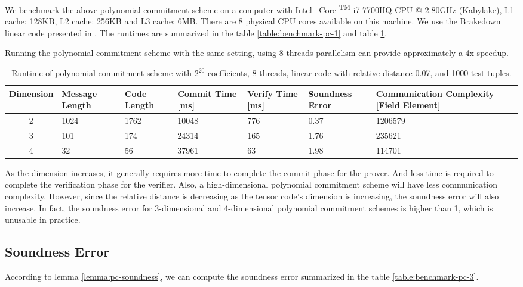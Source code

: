We benchmark the above polynomial commitment scheme on a computer with
Intel \textregistered \, Core  \textsuperscript{TM} i7-7700HQ CPU @ 2.80GHz (Kabylake), L1 cache: 128KB, L2 cache: 256KB and L3 cache: 6MB. There are 8 physical CPU cores available on this machine. We use the Brakedown linear code presented in \cite{brakedown}. The runtimes are summarized in the table \ref{table:benchmark-pc-1} and table \ref{table:benchmark-pc-2}.


Running the polynomial commitment scheme with the same setting, using 8-threads-parallelism can provide approximately a 4x speedup.

\begin{table}[h!]
\centering
\begin{tabular}{| c | m{4em}  | m{3em}  | m{3.5em} | m{2.5em} | m{5em} | m{7em} |} 
 \hline
 Dimension & Message Length & Code Length & Commit Time [ms] & Verify Time [ms] & Soundness Error & Communication Complexity [Field Element] \\ [0.5ex] 
 \hline\hline
 2 & 1024   & 1762 & 10048 & 776 & 0.37 & 1206579  \\
 \hline
 3 & 101    & 174 & 24314 & 165 & 1.76 & 235621 \\
 \hline
 4 & 32     & 56 & 37961 & 63 & 1.98 & 114701  \\ 
 \hline
\end{tabular}
\caption{Runtime of polynomial commitment scheme with $2^{20}$ coefficients, 8 threads, linear code with relative distance 0.07, and 1000 test tuples.}
\label{table:benchmark-pc-2}
\end{table}


As the dimension increases, it generally requires more time to complete the commit phase for the prover. And less time is required to complete the verification phase for the verifier. Also, a high-dimensional polynomial commitment scheme will have less communication complexity. However, since the relative distance is decreasing as the tensor code's dimension is increasing, the soundness error will also increase. In fact, the soundness error for 3-dimensional and 4-dimensional polynomial commitment schemes is higher than 1, which is unusable in practice.

\subsection{Soundness Error}

According to lemma \ref{lemma:pc-soundness}, we can compute the soundness error summarized in the table \ref{table:benchmark-pc-3}.

